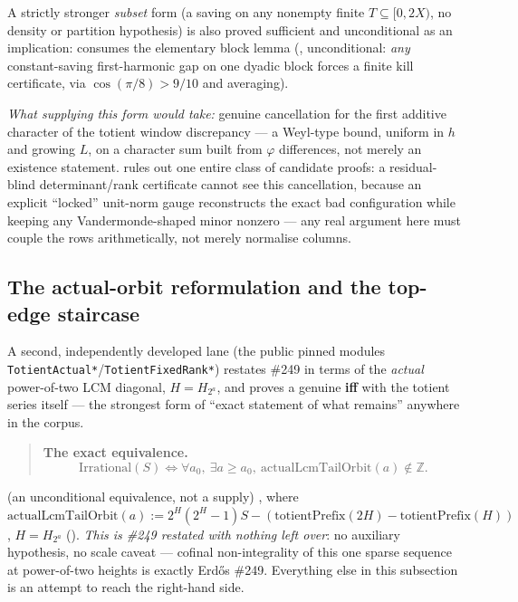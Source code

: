 A strictly stronger \emph{subset} form (a saving on any nonempty
finite $T\subseteq[0,2X)$, no density or partition hypothesis) is also
proved sufficient and unconditional as an implication:
consumes the elementary block lemma
(, unconditional: \emph{any} constant-saving first-harmonic gap on
one dyadic block forces a finite kill certificate, via $\cos(\pi/8)>9/10$
and averaging).

\emph{What supplying this form would take:} genuine
cancellation for the first additive character of the totient window
discrepancy — a Weyl-type bound, uniform in $h$ and growing $L$, on a
character sum built from $\varphi$ differences, not merely an existence
statement. 
rules out one entire class of candidate proofs: a residual-blind
determinant/rank certificate cannot see this cancellation, because an
explicit ``locked'' unit-norm gauge reconstructs the exact bad configuration
while keeping any Vandermonde-shaped minor nonzero — any real argument here
must couple the rows arithmetically, not merely normalise columns.

\subsection{The actual-orbit reformulation and the top-edge staircase}

A second, independently developed lane (the public pinned modules
\texttt{TotientActual*}/\texttt{TotientFixedRank*}) restates \#249 in terms of the \emph{actual}
power-of-two LCM diagonal, $H = H_{2^a}$, and proves a genuine \textbf{iff}
with the totient series itself — the strongest form of ``exact statement of
what remains'' anywhere in the corpus.

\begin{quote}
\textbf{The exact equivalence.}
\[
  \mathrm{Irrational}(S)
  \iff
  \forall a_0,\ \exists a\ge a_0,\ \mathrm{actualLcmTailOrbit}(a)\notin\mathbb{Z}.
\]
\end{quote}
\quad {} \quad {} (an unconditional equivalence, not a
supply) \quad {}, where
$\mathrm{actualLcmTailOrbit}(a) := 2^H(2^H-1)S - (\mathrm{totientPrefix}(2H)-\mathrm{totientPrefix}(H))$,
$H=H_{2^a}$
().
\emph{This is \#249 restated with nothing left over}: no auxiliary
hypothesis, no scale caveat — cofinal non-integrality of this one sparse
sequence at power-of-two heights is exactly Erdős \#249. Everything else in
this subsection is an attempt to reach the right-hand side.

